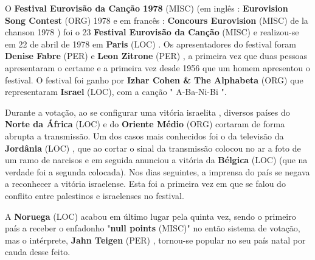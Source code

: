 \documentclass[12pt,a4paper]{article}
\begin{document}
O \textbf{Festival Eurovisão da Canção 1978} (MISC) (em inglês : \textbf{Eurovision Song Contest} (ORG) 1978 e em francês : \textbf{Concours Eurovision} (MISC) de la chanson 1978 ) foi o 23 \textbf{Festival Eurovisão da Canção} (MISC) e realizou-se em 22 de abril de 1978 em \textbf{Paris} (LOC) . Os apresentadores do festival foram \textbf{Denise Fabre} (PER) e \textbf{Leon Zitrone} (PER) , a primeira vez que duas pessoas apresentaram o certame e a primeira vez desde 1956 que um homem apresentou o festival. O festival foi ganho por \textbf{Izhar Cohen \& The Alphabeta} (ORG) que representaram \textbf{Israel} (LOC), com a canção " A-Ba-Ni-Bi ".

Durante a votação, ao se configurar uma vitória israelita , diversos países do \textbf{Norte da África} (LOC) e do \textbf{Oriente Médio} (ORG) cortaram de forma abrupta a transmissão. Um dos casos mais conhecidos foi o da televisão da \textbf{Jordânia} (LOC) , que ao cortar o sinal da transmissão colocou no ar a foto de um ramo de narcisos e em seguida anunciou a vitória da \textbf{Bélgica} (LOC) (que na verdade foi a segunda colocada). Nos dias seguintes, a imprensa do país se negava a reconhecer a vitória israelense. Esta foi a primeira vez em que se falou do conflito entre palestinos e israelenses no festival.

A \textbf{Noruega} (LOC) acabou em último lugar pela quinta vez, sendo o primeiro país a receber o enfadonho "\textbf{null points} (MISC)" no então sistema de votação, mas o intérprete, \textbf{Jahn Teigen} (PER) , tornou-se popular no seu país natal por cauda desse feito.
\end{document}
